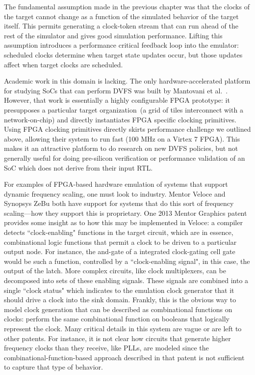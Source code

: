
The fundamental assumption made in the previous chapter was that the clocks of
the target cannot change as a function of the simulated behavior of the target
itself. This permits generating a clock-token stream that can run ahead of the
rest of the simulator and gives good simulation performance. Lifting this
assumption introduces a performance critical feedback loop into the
emulator: scheduled clocks determine when target state updates occur, but those
updates affect when target clocks are scheduled.

Academic work in this domain is lacking. The only hardware-accelerated platform
for studying SoCs that can perform DVFS was built by Mantovani et
al.~\cite{DVFSPrototype}. However, that work is essentially a highly configurable FPGA
prototype: it presupposes a particular target organization~(a grid of tiles
interconnect with a network-on-chip) and directly instantiates FPGA specific
clocking primitives. Using FPGA clocking primitives directly skirts performance
challenge we outlined above, allowing their system to run fast (100 MHz on a
Virtex 7 FPGA). This makes it an attractive platform to do research on new
DVFS policies, but not generally useful for doing pre-silicon verification or
performance validation of an SoC which does not derive from their input RTL.

For examples of FPGA-based hardware emulation of systems that support dynamic
frequency scaling, one must look to industry. Mentor Veloce and Synopsys ZeBu
both have support for systems that do this sort of frequency scaling---how
they support this is proprietary. One 2013 Mentor Graphics patent~\cite{MentorClockGen} provides some
insight as to how this may be implemented in Veloce: a compiler detects
``clock-enabling" functions in the target circuit, which are in essence,
combinational logic functions that permit a clock to be driven to a particular
output node. For instance, the and-gate of a integrated clock-gating cell gate would be such a
function, controlled by a ``clock-enabling signal", in this case, the output of the latch. More
complex circuits, like clock multiplexers, can be decomposed into
sets of these enabling signals. These signals are combined into a single
``clock status" which indicates to the emulation clock generator that it
should drive a clock into the sink domain. Frankly, this is the obvious way
to model clock generation that can be described as combinational functions on
clocks: perform the same combinational function on booleans that logically
represent the clock.  Many critical details in this system are vague or are left
to other patents. For instance, it is not clear how circuits that generate
higher frequency clocks than they receive, like PLLs, are modeled since the
combinational-function-based approach described in that patent is not
sufficient to capture that type of behavior.

